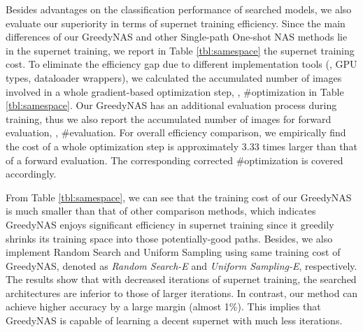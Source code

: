 \documentclass[10pt,twocolumn,letterpaper]{article}
\begin{document}
Besides advantages on the classification performance of searched models, we also evaluate our superiority in terms of supernet training efficiency. Since the main differences of our GreedyNAS and other Single-path One-shot NAS methods lie in the supernet training, we report in Table \ref{tbl:samespace} the supernet training cost. To eliminate the efficiency gap due to different implementation tools (\eg, GPU types, dataloader wrappers), we calculated the accumulated number of images involved in a whole gradient-based optimization step, \ie, \#optimization in Table \ref{tbl:samespace}. Our GreedyNAS has an additional evaluation process during training, thus we also report the accumulated number of images for forward evaluation, \ie, \#evaluation. For overall efficiency comparison, we empirically find the cost of a whole optimization step is approximately 3.33 times larger than that of a forward evaluation. The corresponding corrected \#optimization is covered accordingly. 




From Table \ref{tbl:samespace}, we can see that the training cost of our GreedyNAS is much smaller than that of other comparison methods, which indicates GreedyNAS enjoys significant efficiency in supernet training since it greedily shrinks its training space into those potentially-good paths. Besides, we also implement Random Search and Uniform Sampling using same training cost of GreedyNAS, denoted as \textit{Random Search-E} and \textit{Uniform Sampling-E}, respectively. The results show that with decreased iterations of supernet training, the searched architectures are inferior to those of larger iterations. In contrast, our method can achieve higher accuracy by a large margin (almost 1\%). This implies that GreedyNAS is capable of learning a decent supernet with much less iterations. 
\end{document}

